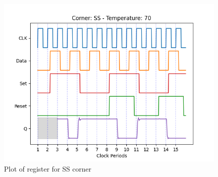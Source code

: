 \begin{figure}[H]
    \centering
    \begin{minipage}{0.5\textwidth}
        \centering
        \includegraphics[width=\textwidth]{Figures/Aimspice_Plots/SS_70.png}
        \caption{Plot of register for SS corner}
        \label{fig:SS70}
    \end{minipage}%
\end{figure}

